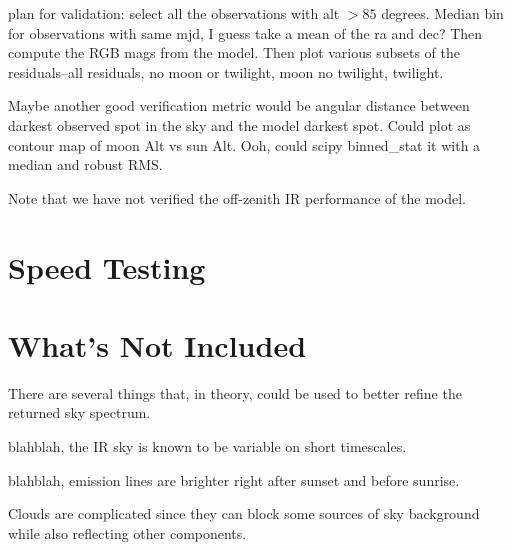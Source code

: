 \documentclass{emulateapj}  %
\begin{document}
plan for validation:
select all the observations with alt $>85$ degrees. Median bin for observations with same mjd, I guess take a mean of the ra and dec? Then compute the RGB mags from the model.  Then plot various subsets of the residuals--all residuals, no moon or twilight, moon no twilight, twilight.

Maybe another good verification metric would be angular distance between darkest observed spot in the sky and the model darkest spot.  Could plot as contour map of moon Alt vs sun Alt.  Ooh, could scipy binned\_stat it with a median and robust RMS.


Note that we have not verified the off-zenith IR performance of the model.  

\section{Speed Testing}



\section{What's Not Included}

There are several things that, in theory, could be used to better refine the returned sky spectrum.

blahblah, the IR sky is known to be variable on short timescales.

blahblah, emission lines are brighter right after sunset and before sunrise.

Clouds are complicated since they can block some sources of sky background while also reflecting other components.  



\end{document}
